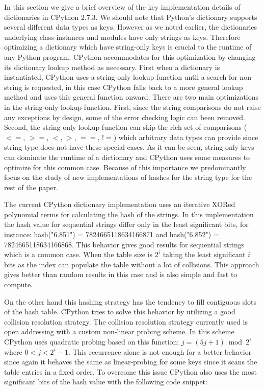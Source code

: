 \documentclass[11pt]{article}
\begin{document}
In this section we give a brief overview of the key implementation details of
dictionaries in CPython 2.7.3.  We should note that Python's dictionary supports
several different data types as keys. However as we noted earlier, the
dictionaries underlying class instances and modules have only strings as keys.
Therefore optimizing a dictionary which have string-only keys is crucial to the
runtime of any Python program. CPython accommodates for this optimization by
changing its dictionary lookup method as necessary. First when a dictionary is
instantiated, CPython uses a string-only lookup function until a search for
non-string is requested, in this case CPython falls back to a more general
lookup method and uses this general function onward. There are two main
optimizations in the string-only lookup function.  First, since the string
comparisons do not raise any exceptions by design, some of the error checking
logic can been removed. Second, the string-only lookup function can skip the
rich set of comparisons ( $<=$, $>=$, $<$, $>$, $==$, $!=$) which arbitrary data
types can provide since string type does not have these special cases.  As it
can be seen, string-only keys can dominate the runtime of a dictionary and
CPython uses some measures to optimize for this common case. Because of this
importance we predominantly focus on the study of new implementations of
hashes for the string type for the rest of the paper.

The current CPython dictionary implementation uses an iterative XORed polynomial
terms for calculating the hash of the strings. In this implementation the hash
value for sequential strings differ only in the least significant bits, for
instance: hash("6.851") = 7824665118634166871 and hash("6.852") =
7824665118634166868. This behavior gives good results for sequential strings
which is a common case. When the table size is $2^i$ taking the least
significant $i$ bits as the index can populate the table without a lot of
collisions. This approach gives better than random results in this case and is
also simple and fast to compute.

On the other hand this hashing strategy has the tendency to fill contiguous
slots of the hash table. CPython tries to solve this behavior by utilizing a
good collision resolution strategy. The collision resolution strategy currently
used is open addressing with a custom non-linear probing scheme. In this scheme
CPython uses quadratic probing based on this function: $j = (5j + 1) \bmod 2^i$
where $0<j<2^i-1$. This recurrence alone is not enough for a better behavior
since again it behaves the same as linear-probing for some keys since it scans
the table entries in a fixed order. To overcome this issue CPython also uses the
most significant bits of the hash value with the following code snippet:
\end{document}
